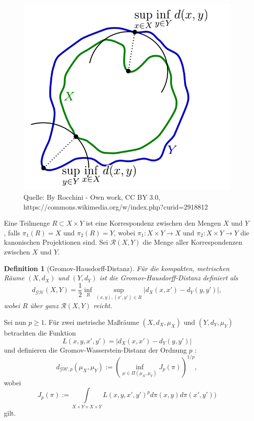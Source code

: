 \documentclass[11pt,a4paper]{article}
\newcommand{\source}[1]{\caption*{\hfill Quelle: {#1}} }
\def\emph#1{\textit{#1}}
\newtheorem{definition}[theorem]{Definition}
\numberwithin{equation}{section}
\begin{document}
	\begin{figure}[ht]
		\centering
		\includegraphics[width=0.3\textheight]{Hausdorff_distance.png}
		\caption{Visualisierung der Hausdorff-Distanz zwischen den Mengen $X$ und $Y$ in $\mathbb{R}^2$.}
		\source{By Rocchini - Own work, CC BY 3.0, https://commons.wikimedia.org/w/index.php?curid=2918812}
		\label{im:hausdorff_example}
	\end{figure}
	
	
	Eine Teilmenge $R \subset X \times Y$ ist eine Korrespondenz zwischen den Mengen $X$ und $Y$, falls $\pi_1(R) = X$ und $\pi_2(R) = Y$, wobei $\pi_1: X \times Y \to X$ und $\pi_2: X \times Y \to Y$ die kanonischen Projektionen sind. Sei $\mathcal{R}(X,Y)$ die Menge aller Korrespondenzen zwischen $X$ und $Y$.
	
	\begin{definition}[Gromov-Hausdorff-Distanz]
		Für die kompakten, metrischen Räume $(X,d_X)$ und $(Y,d_Y)$ ist die \emph{Gromov-Hausdorff-Distanz} definiert als
		\begin{equation}
		d_{\mathcal{G}\mathcal{H}}(X,Y) = \frac{1}{2}\inf_{R} \sup_{(x,y),(x',y') \in R}{|d_X(x,x')- d_Y(y,y')|}, \label{eq:gh}
		\end{equation}
		wobei $R$ über ganz $\mathcal{R}(X,Y)$ reicht.
	\end{definition}
	
	Sei nun $p\geq 1$. Für zwei metrische Maßräume $(X,d_X,\mu_X)$ und $(Y,d_Y,\mu_Y)$ betrachten die Funktion 
	\begin{equation}
	L(x,y,x',y') = |d_X(x,x') - d_Y(y,y')|
	\end{equation}
	und definieren die Gromov-Wasserstein-Distanz der Ordnung $p$ \cite{memoli2011gromov}:
	\begin{equation}
	d_{\mathcal{GW},p}(\mu_X,\mu_Y):=\left(\inf_{\mu \in \Pi(\mu_X, \mu_Y)} {J_p(\pi)}\right)^{1/p},
	\end{equation}
	wobei
	\begin{equation}
	J_p(\pi) := \int\limits_{X\times Y \times  X\times Y}{L(x,y,x',y')^pd\pi(x,y)d\pi(x',y'))}
	\end{equation}
	gilt.
	
\end{document}
